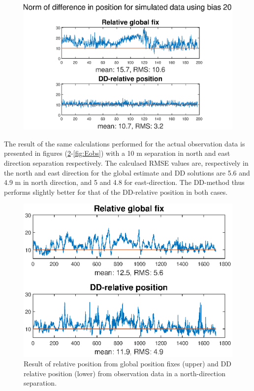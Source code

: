 \begin{figure}[!htb]
\includegraphics[width=\textwidth]{Results/MSEplots/Nsim20.eps}
\caption{\label{fig:Nsim20}}
\end{figure}
\par
The result of the same calculations performed for the actual observation data is presented in figures (\ref{fig:Nobs}-\ref{fig:Eobs}) with a 10 m separation in north and east direction separation respectively. The calculaed RMSE values are, respectively in the north and east direction for the global estimate and DD solutions are 5.6 and 4.9 m in north direction, and 5 and 4.8 for east-direction. The DD-method thus performs slightly better for that of the DD-relative position in both cases.
\begin{figure}[!htb]
\centering
\includegraphics[width=\textwidth]{Results/MSEplots/Nobs.eps}
\caption{\label{fig:Nobs} Result of relative position from global position fixes (upper) and DD relative position (lower) from observation data in a north-direction separation.}
\end{figure}
